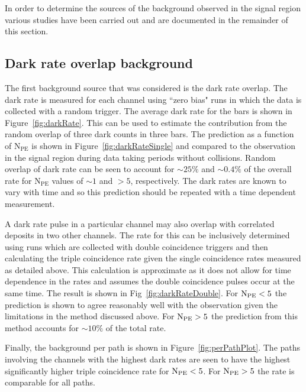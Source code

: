 \documentclass[12pt]{article}
\newcommand{\npe} {\mbox{\ensuremath{\textrm{N}_\textrm{PE}}}\xspace}
\begin{document}
In order to determine the sources of the background observed in the signal region 
various studies have been carried out and are documented in the remainder of this section.

\subsection{Dark rate overlap background}

The first background source that was considered is the dark rate overlap. The dark rate is measured
for each channel using ``zero bias" runs in which the data is collected with a random trigger.
The average dark rate for the bars is shown in Figure~\ref{fig:darkRate}. This can be used to estimate the 
contribution from the random overlap of three dark counts in three bars. 
The prediction as a function of \npe is shown in Figure~\ref{fig:darkRateSingle} and 
compared to the observation in the signal region during data taking periods without collisions. 
Random overlap of dark rate can be seen to account for $\sim25\%$ and $\sim0.4\%$ 
of the overall rate for \npe values of $\sim 1$ and $> 5$, respectively. The dark rates are 
known to vary with time and so this prediction should be repeated with a time
dependent measurement.

A dark rate pulse in a particular channel may also overlap with correlated deposits in two
other channels. The rate for this can be inclusively determined using runs which 
are collected with double coincidence triggers and then calculating the triple
coincidence rate given the single coincidence rates measured as detailed above.
This calculation is approximate as it does not allow for time dependence in the rates and assumes
the double coincidence pulses occur at the same time. The result is shown
in Fig~\ref{fig:darkRateDouble}. For $\npe < 5$ the prediction is shown to agree reasonably well
with the observation given the limitations in the method discussed above. For $\npe > 5$ the prediction
from this method accounts for $\sim 10\%$ of the total rate.

Finally, the background per path is shown in Figure~\ref{fig:perPathPlot}. The paths involving
the channels with the highest dark rates are seen to have the highest 
significantly higher triple coincidence rate for $\npe < 5$. For $\npe > 5$ the
rate is comparable for all paths.
\end{document}
